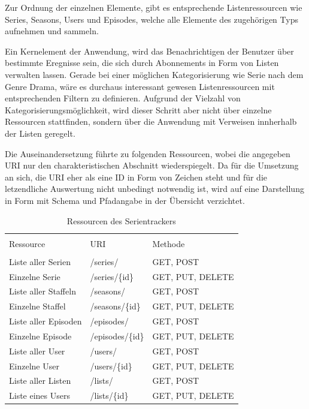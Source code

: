 \documentclass[a4paper]{article}
\begin{document}
Zur Ordnung der einzelnen Elemente, gibt es entsprechende Listenressourcen wie Series, Seasons, Users und Episodes, welche alle Elemente des zugehörigen Typs aufnehmen und sammeln.

Ein Kernelement der Anwendung, wird das Benachrichtigen der Benutzer über bestimmte Eregnisse sein, die sich durch Abonnements in Form von Listen verwalten lassen. Gerade bei einer möglichen Kategorisierung wie Serie nach dem Genre Drama, wäre es durchaus interessant gewesen Listenressourcen mit entsprechenden Filtern zu definieren. Aufgrund der Vielzahl von Kategorisierungsmöglichkeit, wird dieser Schritt aber nicht über einzelne Ressourcen stattfinden, sondern über die Anwendung mit Verweisen innherhalb der Listen geregelt.

\newpage

Die Auseinandersetzung führte zu folgenden Ressourcen, wobei die angegeben URI nur den charakteristischen Abschnitt wiederspiegelt.
Da für die Umsetzung an sich, die URI eher als eine ID in Form von Zeichen steht und für die letzendliche Auswertung nicht unbedingt notwendig ist, wird auf eine Darstellung in Form mit Schema und Pfadangabe in der Übersicht verzichtet.


\begin{table}[H]
\caption{Ressourcen des Serientrackers}

\centering
\begin{tabular}{l l l}
\\ [-0.5ex]

\hline\hline
\\ [-0.5ex]
Ressource & URI & Methode
\\ [1.5ex]
\hline
\\ [-0.5ex]
Liste aller Serien & /series/ & GET, POST \\[1ex]
Einzelne Serie & /series/\{id\} & GET, PUT, DELETE\\[1ex]
Liste aller Staffeln & /seasons/ & GET, POST \\[1ex]
Einzelne Staffel & /seasons/\{id\} & GET, PUT, DELETE\\[1ex]
Liste aller Episoden & /episodes/ & GET, POST \\[1ex]
Einzelne Episode & /episodes/\{id\} & GET, PUT, DELETE\\[1ex]
Liste aller User & /users/ & GET, POST \\[1ex]
Einzelne User & /users/\{id\} & GET, PUT, DELETE\\[1ex]
Liste aller Listen & /lists/ & GET, POST\\[1ex]
Liste eines Users & /lists/\{id\} & GET, PUT, DELETE\\[1ex]
\hline
\end{tabular}
\label{tab:ressourcendesserientrackers}
\end{table}
\end{document}
